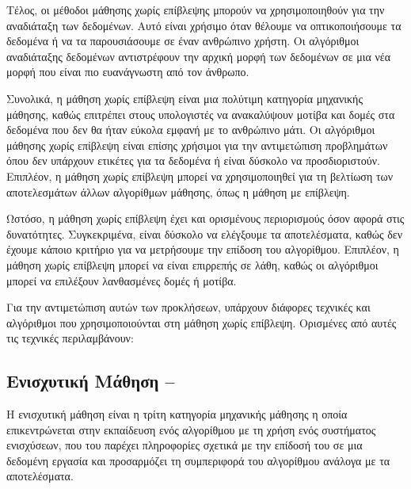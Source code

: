 Τέλος, οι μέθοδοι μάθησης χωρίς επίβλεψης μπορούν να χρησιμοποιηθούν για την αναδιάταξη των δεδομένων. Αυτό είναι χρήσιμο όταν θέλουμε να οπτικοποιήσουμε τα δεδομένα ή να τα παρουσιάσουμε σε έναν ανθρώπινο χρήστη. Οι αλγόριθμοι αναδιάταξης δεδομένων αντιστρέφουν την αρχική μορφή των δεδομένων σε μια νέα μορφή που είναι πιο ευανάγνωστη από τον άνθρωπο.

Συνολικά, η μάθηση χωρίς επίβλεψη είναι μια πολύτιμη κατηγορία μηχανικής μάθησης, καθώς επιτρέπει στους υπολογιστές να ανακαλύψουν μοτίβα και δομές στα δεδομένα που δεν θα ήταν εύκολα εμφανή με το ανθρώπινο μάτι. Οι αλγόριθμοι μάθησης χωρίς επίβλεψη είναι επίσης χρήσιμοι για την αντιμετώπιση προβλημάτων όπου δεν υπάρχουν ετικέτες για τα δεδομένα ή είναι δύσκολο να προσδιοριστούν. Επιπλέον, η μάθηση χωρίς επίβλεψη μπορεί να χρησιμοποιηθεί για τη βελτίωση των αποτελεσμάτων άλλων αλγορίθμων μάθησης, όπως η μάθηση με επίβλεψη.

Ωστόσο, η μάθηση χωρίς επίβλεψη έχει και ορισμένους περιορισμούς όσον αφορά στις δυνατότητες. Συγκεκριμένα, είναι δύσκολο να ελέγξουμε τα αποτελέσματα, καθώς δεν έχουμε κάποιο κριτήριο για να μετρήσουμε την επίδοση του αλγορίθμου. Επιπλέον, η μάθηση χωρίς επίβλεψη μπορεί να είναι επιρρεπής σε λάθη, καθώς οι αλγόριθμοι μπορεί να επιλέξουν λανθασμένες δομές ή μοτίβα. 

Για την αντιμετώπιση αυτών των προκλήσεων, υπάρχουν διάφορες τεχνικές και αλγόριθμοι που χρησιμοποιούνται στη μάθηση χωρίς επίβλεψη. Ορισμένες από αυτές τις τεχνικές περιλαμβάνουν:

\subsection{Ενισχυτική Μάθηση – }
Η ενισχυτική μάθηση είναι η τρίτη κατηγορία μηχανικής μάθησης η οποία επικεντρώνεται στην εκπαίδευση ενός αλγορίθμου με τη χρήση ενός συστήματος ενισχύσεων, που του παρέχει πληροφορίες σχετικά με την επίδοσή του σε μια δεδομένη εργασία και προσαρμόζει τη συμπεριφορά του αλγορίθμου ανάλογα με τα αποτελέσματα.


